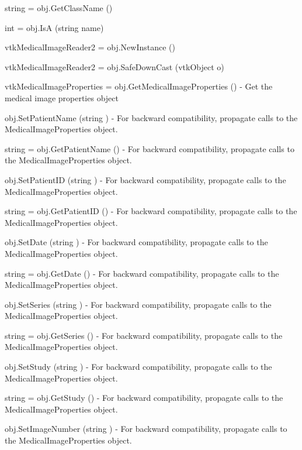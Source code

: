 \begin{DoxyItemize}
\item {\ttfamily string = obj.\-Get\-Class\-Name ()}  
\item {\ttfamily int = obj.\-Is\-A (string name)}  
\item {\ttfamily vtk\-Medical\-Image\-Reader2 = obj.\-New\-Instance ()}  
\item {\ttfamily vtk\-Medical\-Image\-Reader2 = obj.\-Safe\-Down\-Cast (vtk\-Object o)}  
\item {\ttfamily vtk\-Medical\-Image\-Properties = obj.\-Get\-Medical\-Image\-Properties ()} -\/ Get the medical image properties object  
\item {\ttfamily obj.\-Set\-Patient\-Name (string )} -\/ For backward compatibility, propagate calls to the Medical\-Image\-Properties object.  
\item {\ttfamily string = obj.\-Get\-Patient\-Name ()} -\/ For backward compatibility, propagate calls to the Medical\-Image\-Properties object.  
\item {\ttfamily obj.\-Set\-Patient\-I\-D (string )} -\/ For backward compatibility, propagate calls to the Medical\-Image\-Properties object.  
\item {\ttfamily string = obj.\-Get\-Patient\-I\-D ()} -\/ For backward compatibility, propagate calls to the Medical\-Image\-Properties object.  
\item {\ttfamily obj.\-Set\-Date (string )} -\/ For backward compatibility, propagate calls to the Medical\-Image\-Properties object.  
\item {\ttfamily string = obj.\-Get\-Date ()} -\/ For backward compatibility, propagate calls to the Medical\-Image\-Properties object.  
\item {\ttfamily obj.\-Set\-Series (string )} -\/ For backward compatibility, propagate calls to the Medical\-Image\-Properties object.  
\item {\ttfamily string = obj.\-Get\-Series ()} -\/ For backward compatibility, propagate calls to the Medical\-Image\-Properties object.  
\item {\ttfamily obj.\-Set\-Study (string )} -\/ For backward compatibility, propagate calls to the Medical\-Image\-Properties object.  
\item {\ttfamily string = obj.\-Get\-Study ()} -\/ For backward compatibility, propagate calls to the Medical\-Image\-Properties object.  
\item {\ttfamily obj.\-Set\-Image\-Number (string )} -\/ For backward compatibility, propagate calls to the Medical\-Image\-Properties object.  

\end{DoxyItemize}
